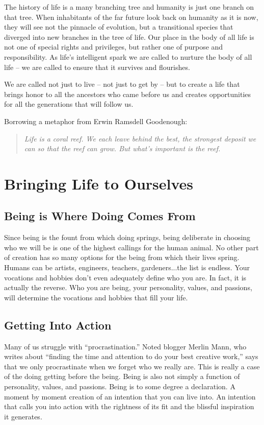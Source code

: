 \documentclass[ebook,12pt,openany,twoside]{memoir}
\begin{document}
The history of life is a many branching tree and humanity is just one branch on
that tree. When inhabitants of the far future look back on humanity as it is
now, they will see not the pinnacle of evolution, but a transitional species
that diverged into new branches in the tree of life. Our place in the body of
all life is not one of special rights and privileges, but rather one of purpose
and responsibility. As life's intelligent spark we are called to nurture the
body of all life -- we are called to ensure that it survives and flourishes.

We are called not just to live -- not just to get by -- but to create a life
that brings honor to all the ancestors who came before us and creates
opportunities for all the generations that will follow us.

Borrowing a metaphor from Erwin Ramsdell Goodenough:

\begin{quote}
	\em Life is a coral reef. We each leave behind the best, the strongest
	deposit we can so that the reef can grow. But what's important is the
	reef.
\end{quote}


\part{Bringing Life to Ourselves}

\chapter{Being is Where Doing Comes From}

Since being is the fount from which doing springs, being deliberate in choosing
who we will be is one of the highest callings for the human animal. No other
part of creation has so many options for the being from which their lives
spring. Humans can be artists, engineers, teachers, gardeners...the list is
endless. Your vocations and hobbies don't even adequately define who you are.
In fact, it is actually the reverse. Who you are being, your personality,
values, and passions, will determine the vocations and hobbies that fill your
life.

\chapter{Getting Into Action}

Many of us struggle with ``procrastination.'' Noted blogger Merlin Mann, who
writes about ``finding the time and attention to do your best creative work,''
says that we only procrastinate when we forget who we really are. This is
really a case of the doing getting before the being. Being is also not simply a
function of personality, values, and passions. Being is to some degree a
declaration. A moment by moment creation of an intention that you can live
into. An intention that calls you into action with the rightness of its fit and
the blissful inspiration it generates.
\end{document}
